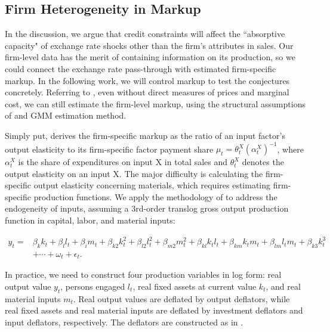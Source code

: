 \documentclass[12pt]{article}
\begin{document}
\subsection{Firm Heterogeneity in Markup}
In the discussion, we argue that credit constraints will affect the ``absorptive capacity" of exchange rate shocks other than the firm's attributes in sales. Our firm-level data has the merit of containing information on its production, so we could connect the exchange rate pass-through with estimated firm-specific markup. In the following work, we will control markup to test the conjectures concretely. Referring to \cite{bkl2021}, even without direct measures of prices and marginal cost, we can still estimate the firm-level markup, using the structural assumptions of \cite{dlw2012} and GMM estimation method.

Simply put, \cite{dlw2012} derives the firm-specific markup as the ratio of an input factor's output elasticity to its firm-specific factor payment share $\mu_{t}=\theta_{t}^{X}\left(\alpha_{t}^{X}\right)^{-1}$, where $\alpha_{t}^{X}$ is the share of expenditures on input X in total sales and $\theta^X_t$ denotes the output elasticity on an input X. The major difficulty is calculating the firm-specific output elasticity concerning materials, which requires estimating firm-specific production functions. We apply the methodology of \cite{acf2015} to address the endogeneity of inputs, assuming a 3rd-order translog gross output production function in capital, labor, and material inputs:

$$
\begin{aligned}
	y_{t}= &\beta_{k} k_{t}+\beta_{l} l_{t}+\beta_{i} m_{t}+\beta_{k 2} k_{t}^{2}+\beta_{l 2} l_{t}^{2}+\beta_{m 2} m_{t}^{2}+\beta_{k l} k_{ t} l_{t}+\beta_{k m} k_{t} m_{t}+\beta_{l m} l_{t} m_{t}+\beta_{k 3} k_{t}^{3}\\
	&+\cdots+\omega_{t}+\epsilon_{t}.
\end{aligned}
$$

In practice, we need to construct four production variables in log form: real output value $y_t$, persons engaged $l_t$, real fixed assets at current value $k_t$, and real material inputs $m_t$. Real output values are deflated by output deflators, while real fixed assets and real material inputs are deflated by investment deflators and input deflators, respectively. The deflators are constructed as in \cite{brandt2012}.
\end{document}
